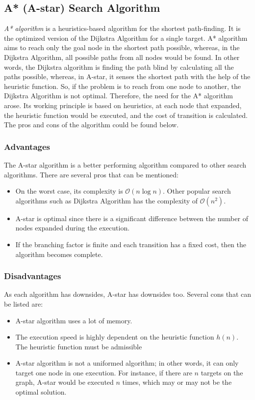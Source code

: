 \documentclass{IEEEtran}
\begin{document}
\subsection{A* (A-star) Search Algorithm}
\textit{A* algorithm} is a heuristics-based algorithm for the shortest path-finding. It is the optimized version of the Dijkstra Algorithm for a single target. A* algorithm aims to reach only the goal node in the shortest path possible, whereas, in the Dijkstra Algorithm, all possible paths from all nodes would be found. In other words, the Dijkstra algorithm is finding the path blind by calculating all the paths possible, whereas, in A-star, it senses the shortest path with the help of the heuristic function. So, if the problem is to reach from one node to another, the Dijkstra Algorithm is not optimal. Therefore, the need for the A* algorithm arose. Its working principle is based on heuristics, at each node that expanded, the heuristic function would be executed, and the cost of transition is calculated. \cite{astar-redblob} The pros and cons of the algorithm could be found below.\\
\subsubsection{Advantages}
The A-star algorithm is a better performing algorithm compared to other search algorithms. There are several pros that can be mentioned:
\begin{itemize}
	\item On the worst case, its complexity is $\mathcal{O}(n\log{}n)$. Other popular search algorithms such as Dijkstra Algorithm has the complexity of $\mathcal{O}(n^2)$.
	\item A-star is optimal since there is a significant difference between the number of nodes expanded during the execution.
	\item If the branching factor is finite and each transition has a fixed cost, then the algorithm becomes complete. \cite{astar-brainkart}\\
\end{itemize}
\subsubsection{Disadvantages}
As each algorithm has downsides, A-star has downsides too. Several cons that can be listed are:
\begin{itemize}
	\item A-star algorithm uses a lot of memory.
	\item The execution speed is highly dependent on the heuristic function $h(n)$. The heuristic function must be admissible 
	\item A-star algorithm is not a uniformed algorithm; in other words, it can only target one node in one execution. For instance, if there are $n$ targets on the graph, A-star would be executed $n$ times, which may or may not be the optimal solution.
\end{itemize}
\end{document}
